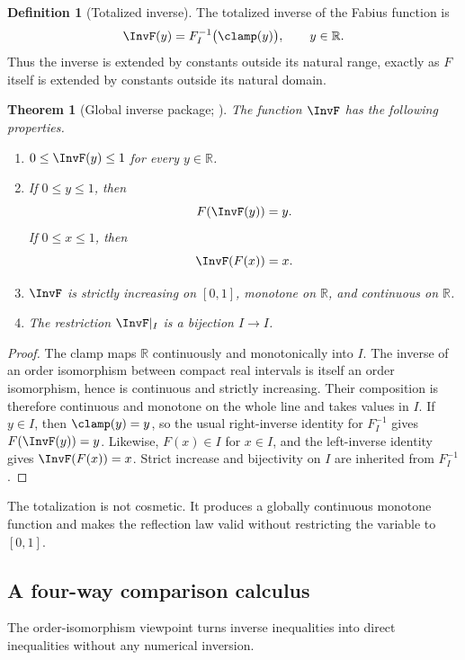 \documentclass[11pt,oneside]{article}
\newtheorem{theorem}{Theorem}[section]
\theoremstyle{definition}
\newtheorem{definition}[definition]{Definition}
\theoremstyle{remark}
\newcommand{\R}{\mathbb R}
\begin{document}
\begin{definition}[Totalized inverse]
\label{inverse:def:totalized-inverse}
The totalized inverse of the Fabius function is
\[
 \InvF(y)=F_I^{-1}\bigl(\clamp(y)\bigr),\qquad y\in\R.
\]
Thus the inverse is extended by constants outside its natural range,
exactly as $F$ itself is extended by constants outside its natural domain.
\end{definition}

\begin{theorem}[Global inverse package; \Formalized]
\label{inverse:thm:inverse-package}
The function $\InvF$ has the following properties.
\begin{enumerate}
\item $0\leq \InvF(y)\leq1$ for every $y\in\R$.
\item If $0\leq y\leq1$, then
\[
 F(\InvF(y))=y.
\]
If $0\leq x\leq1$, then
\[
 \InvF(F(x))=x.
\]
\item $\InvF$ is strictly increasing on $[0,1]$, monotone on $\R$, and
continuous on $\R$.
\item The restriction $\InvF|_I$ is a bijection $I\to I$.
\end{enumerate}
\end{theorem}

\begin{proof}
The clamp maps $\R$ continuously and monotonically into $I$.  The inverse
of an order isomorphism between compact real intervals is itself an order
isomorphism, hence is continuous and strictly increasing.  Their
composition is therefore continuous and monotone on the whole line and
takes values in $I$.  If $y\in I$, then $\clamp(y)=y$, so the usual
right-inverse identity for $F_I^{-1}$ gives $F(\InvF(y))=y$.  Likewise,
$F(x)\in I$ for $x\in I$, and the left-inverse identity gives
$\InvF(F(x))=x$.  Strict increase and bijectivity on $I$ are inherited
from $F_I^{-1}$.
\end{proof}

The totalization is not cosmetic.  It produces a globally continuous
monotone function and makes the reflection law valid without restricting
the variable to $[0,1]$.

\subsection{A four-way comparison calculus}

The order-isomorphism viewpoint turns inverse inequalities into direct
inequalities without any numerical inversion.
\end{document}
